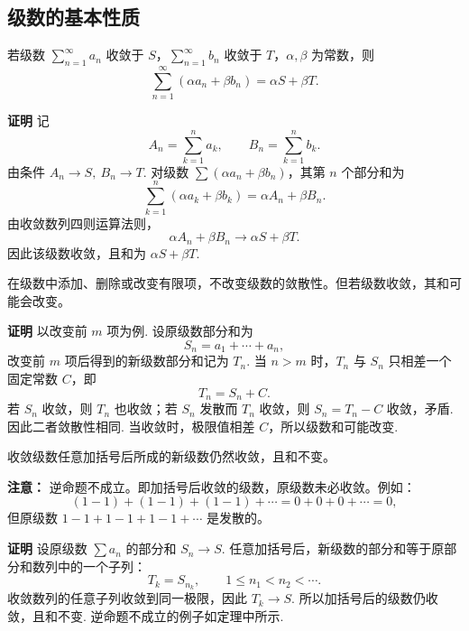 \documentclass[fontset=fandol]{ctexart}
\newenvironment{custom}[1]{\par\noindent\textbf{#1}\quad}{\par\vspace{0.8em}}
\begin{document}
\subsection{级数的基本性质}

\begin{theorem}[级数的线性性质]
若级数 \(\sum_{n=1}^{\infty} a_n\) 收敛于 \(S\)，\(\sum_{n=1}^{\infty} b_n\) 收敛于 \(T\)，\(\alpha, \beta\) 为常数，则
\[
\sum_{n=1}^{\infty} (\alpha a_n + \beta b_n) = \alpha S + \beta T.
\]
\end{theorem}

\begin{custom}{证明}
记
\[
A_n=\sum_{k=1}^{n}a_k,\qquad B_n=\sum_{k=1}^{n}b_k.
\]
由条件 $A_n\to S,\ B_n\to T$. 对级数 $\sum(\alpha a_n+\beta b_n)$，其第 $n$ 个部分和为
\[
\sum_{k=1}^{n}(\alpha a_k+\beta b_k)=\alpha A_n+\beta B_n.
\]
由收敛数列四则运算法则，
\[
\alpha A_n+\beta B_n\to \alpha S+\beta T.
\]
因此该级数收敛，且和为 $\alpha S+\beta T$.
\end{custom}

\begin{theorem}[添加或删除有限项]
在级数中添加、删除或改变有限项，不改变级数的敛散性。但若级数收敛，其和可能会改变。
\end{theorem}

\begin{custom}{证明}
以改变前 $m$ 项为例. 设原级数部分和为
\[
S_n=a_1+\cdots+a_n,
\]
改变前 $m$ 项后得到的新级数部分和记为 $T_n$. 当 $n>m$ 时，$T_n$ 与 $S_n$ 只相差一个固定常数 $C$，即
\[
T_n=S_n+C.
\]
若 $S_n$ 收敛，则 $T_n$ 也收敛；若 $S_n$ 发散而 $T_n$ 收敛，则 $S_n=T_n-C$ 收敛，矛盾. 因此二者敛散性相同. 当收敛时，极限值相差 $C$，所以级数和可能改变.
\end{custom}

\begin{theorem}[加括号]
收敛级数任意加括号后所成的新级数仍然收敛，且和不变。

\textbf{注意：} 逆命题不成立。即加括号后收敛的级数，原级数未必收敛。例如：
\[
(1-1)+(1-1)+(1-1)+\cdots = 0+0+0+\cdots = 0,
\]
但原级数 \(1-1+1-1+1-1+\cdots\) 是发散的。
\end{theorem}

\begin{custom}{证明}
设原级数 $\sum a_n$ 的部分和 $S_n\to S$. 任意加括号后，新级数的部分和等于原部分和数列中的一个子列：
\[
T_k=S_{n_k},\qquad 1\le n_1<n_2<\cdots .
\]
收敛数列的任意子列收敛到同一极限，因此 $T_k\to S$. 所以加括号后的级数仍收敛，且和不变. 逆命题不成立的例子如定理中所示.
\end{custom}
\end{document}
